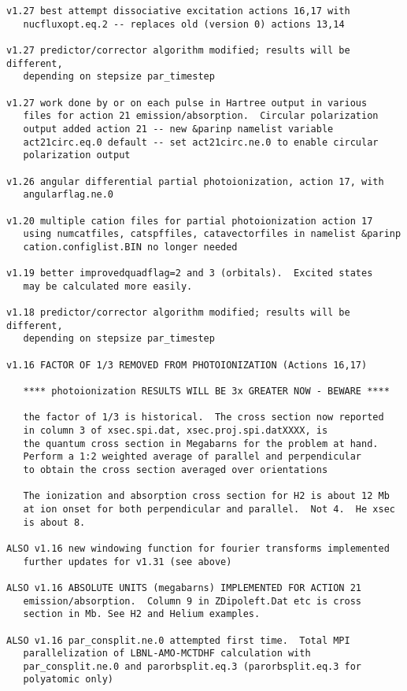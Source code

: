 \begin{verbatim}
v1.27 best attempt dissociative excitation actions 16,17 with
   nucfluxopt.eq.2 -- replaces old (version 0) actions 13,14

v1.27 predictor/corrector algorithm modified; results will be different,
   depending on stepsize par_timestep

v1.27 work done by or on each pulse in Hartree output in various
   files for action 21 emission/absorption.  Circular polarization
   output added action 21 -- new &parinp namelist variable 
   act21circ.eq.0 default -- set act21circ.ne.0 to enable circular 
   polarization output

v1.26 angular differential partial photoionization, action 17, with
   angularflag.ne.0

v1.20 multiple cation files for partial photoionization action 17
   using numcatfiles, catspffiles, catavectorfiles in namelist &parinp
   cation.configlist.BIN no longer needed

v1.19 better improvedquadflag=2 and 3 (orbitals).  Excited states
   may be calculated more easily.

v1.18 predictor/corrector algorithm modified; results will be different,
   depending on stepsize par_timestep

v1.16 FACTOR OF 1/3 REMOVED FROM PHOTOIONIZATION (Actions 16,17)

   **** photoionization RESULTS WILL BE 3x GREATER NOW - BEWARE ****

   the factor of 1/3 is historical.  The cross section now reported
   in column 3 of xsec.spi.dat, xsec.proj.spi.datXXXX, is
   the quantum cross section in Megabarns for the problem at hand.
   Perform a 1:2 weighted average of parallel and perpendicular
   to obtain the cross section averaged over orientations

   The ionization and absorption cross section for H2 is about 12 Mb 
   at ion onset for both perpendicular and parallel.  Not 4.  He xsec
   is about 8.

ALSO v1.16 new windowing function for fourier transforms implemented
   further updates for v1.31 (see above)

ALSO v1.16 ABSOLUTE UNITS (megabarns) IMPLEMENTED FOR ACTION 21
   emission/absorption.  Column 9 in ZDipoleft.Dat etc is cross 
   section in Mb. See H2 and Helium examples.

ALSO v1.16 par_consplit.ne.0 attempted first time.  Total MPI 
   parallelization of LBNL-AMO-MCTDHF calculation with
   par_consplit.ne.0 and parorbsplit.eq.3 (parorbsplit.eq.3 for 
   polyatomic only)


\end{verbatim}
